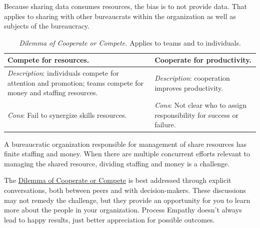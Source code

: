 Because sharing data consumes resources, the bias is to not provide data. That applies to sharing with other bureaucrats within the organization as well as subjects of the bureaucracy. 


\begin{center}
\begin{table}[H] %
\begin{tabular}{ | m{\dilemmatablewidth}| m{\dilemmatablewidth} | } 
  \hline
  \textbf{Compete for resources.} &
  \textbf{Cooperate for productivity.} \\
  \hline
  \textit{Description}: individuals compete for attention and promotion; teams compete for money and staffing resources. &
  \textit{Description}: cooperation improves productivity. \\  
  \hline
  \textit{Cons}: Fail to synergize skills resources. & 
  \textit{Cons}: Not clear who to assign responsibility for success or failure. \\
  \hline
\end{tabular}
\caption{
\textit{Dilemma of Cooperate or Compete.} 
Applies to teams and to individuals. 
}
\label{table:dilemma-personal-cooperate-vs-compete}
\end{table}
\end{center}


A bureaucratic organization responsible for management of share resources has finite staffing and money. When there are multiple concurrent efforts relevant to managing the shared resource,  dividing staffing and money is a challenge. 

The \hyperref[table:dilemma-personal-cooperate-vs-compete]{Dilemma of Cooperate or Compete} 
\iftoggle{printedonpaper}{ (\ref{table:dilemma-personal-cooperate-vs-compete})}{}%
is best addressed through explicit conversations,
both between peers and with decision-makers. These discussions may not remedy the challenge, but they provide an opportunity for you to learn more about the people in your organization. Process Empathy doesn't always lead to happy results, just better appreciation for possible outcomes.

